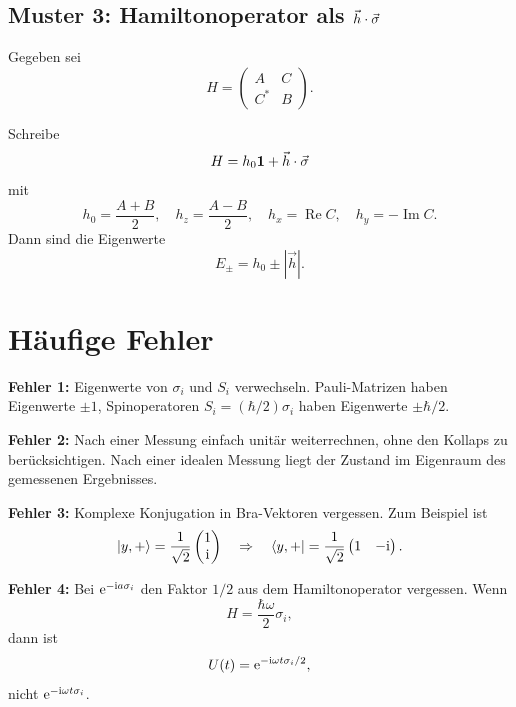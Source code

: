 \subsection{Muster 3: Hamiltonoperator als \(\vec h\cdot\vec\sigma\)}

Gegeben sei
\[
    H=
    \begin{pmatrix}
        A&C\\C^*&B
    \end{pmatrix}.
\]

\begin{calculationbox}
Schreibe
\[
    H=h_0\mathbf{1}+\vec h\cdot\vec\sigma
\]
mit
\[
    h_0=\frac{A+B}{2},
    \quad
    h_z=\frac{A-B}{2},
    \quad
    h_x=\operatorname{Re}C,
    \quad
    h_y=-\operatorname{Im}C.
\]
Dann sind die Eigenwerte
\[
    E_\pm=h_0\pm|\vec h|.
\]
\end{calculationbox}

\section{Häufige Fehler}

\begin{examtipbox}
\textbf{Fehler 1:} Eigenwerte von \(\sigma_i\) und \(S_i\) verwechseln. Pauli-Matrizen haben Eigenwerte \(\pm1\), Spinoperatoren \(S_i=(\hbar/2)\sigma_i\) haben Eigenwerte \(\pm\hbar/2\).
\end{examtipbox}

\begin{examtipbox}
\textbf{Fehler 2:} Nach einer Messung einfach unitär weiterrechnen, ohne den Kollaps zu berücksichtigen. Nach einer idealen Messung liegt der Zustand im Eigenraum des gemessenen Ergebnisses.
\end{examtipbox}

\begin{examtipbox}
\textbf{Fehler 3:} Komplexe Konjugation in Bra-Vektoren vergessen. Zum Beispiel ist
\[
    \left|y,+\right\rangle=\frac{1}{\sqrt2}
    \begin{pmatrix}1\\\mathrm{i}\end{pmatrix}
    \quad\Rightarrow\quad
    \left\langle y,+\right|=\frac{1}{\sqrt2}
    \begin{pmatrix}1&-\mathrm{i}\end{pmatrix}.
\]
\end{examtipbox}

\begin{examtipbox}
\textbf{Fehler 4:} Bei \(\mathrm{e}^{-\mathrm{i} a\sigma_i}\) den Faktor \(1/2\) aus dem Hamiltonoperator vergessen. Wenn
\[
    H=\frac{\hbar\omega}{2}\sigma_i,
\]
dann ist
\[
    U(t)=\mathrm{e}^{-\mathrm{i}\omega t\sigma_i/2},
\]
nicht \(\mathrm{e}^{-\mathrm{i}\omega t\sigma_i}\).
\end{examtipbox}

